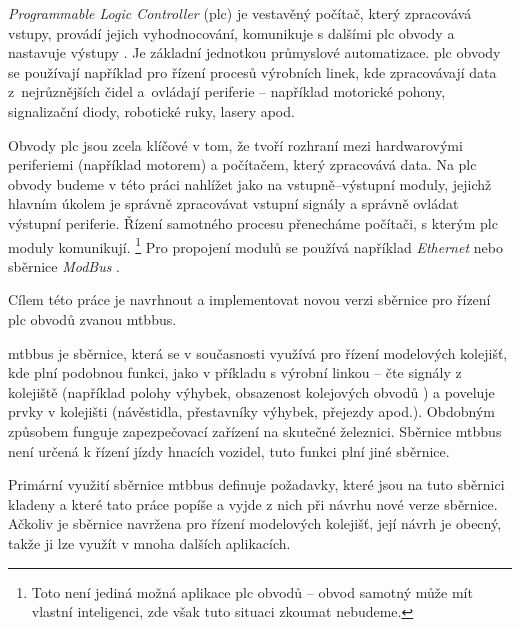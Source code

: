 \textit{Programmable Logic Controller} (\gls{plc}) je vestavěný počítač,
který zpracovává vstupy, provádí jejich vyhodnocování, komunikuje s dalšími
\gls{plc} obvody a nastavuje výstupy \cite{plc:web}. Je základní jednotkou průmyslové
automatizace. \gls{plc} obvody se používají například pro řízení procesů
výrobních linek, kde zpracovávají data z~nejrůznějších čidel a~ovládají
periferie – například motorické pohony, signalizační diody, robotické ruky,
lasery apod.

Obvody \gls{plc} jsou zcela klíčové v tom, že tvoří rozhraní mezi hardwarovými
periferiemi (například motorem) a počítačem, který zpracovává data. Na
\gls{plc} obvody budeme v této práci nahlížet jako na vstupně–výstupní moduly,
jejichž hlavním úkolem je správně zpracovávat vstupní signály a správně ovládat
výstupní periferie. Řízení samotného procesu přenecháme počítači, s kterým
\gls{plc} moduly komunikují. \footnote{Toto není jediná možná aplikace \gls{plc}
obvodů – obvod samotný může mít vlastní inteligenci, zde však tuto situaci
zkoumat nebudeme.} Pro propojení modulů se používá například \textit{Ethernet}
nebo sběrnice \textit{ModBus} \cite{modbus:web}.

Cílem této práce je navrhnout a implementovat novou verzi sběrnice pro řízení
\gls{plc} obvodů zvanou \gls{mtbbus}.

\gls{mtbbus} je sběrnice, která se v současnosti využívá pro řízení modelových
kolejišť, kde plní podobnou funkci, jako v příkladu s výrobní linkou – čte
signály z kolejiště (například polohy výhybek, obsazenost kolejových obvodů
\cite{ko:web}) a poveluje prvky v kolejišti (návěstidla, přestavníky výhybek,
přejezdy apod.). Obdobným způsobem funguje zapezpečovací zařízení na skutečné
železnici. Sběrnice \gls{mtbbus} není určená k řízení jízdy hnacích vozidel,
tuto funkci plní jiné sběrnice.

Primární využití sběrnice \gls{mtbbus} definuje požadavky, které jsou na tuto sběrnici
kladeny a které tato práce popíše a vyjde z nich při návrhu nové verze sběrnice.
Ačkoliv je sběrnice navržena pro řízení modelových kolejišť, její návrh je
obecný, takže ji lze využít v mnoha dalších aplikacích.
